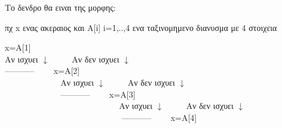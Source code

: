 \documentclass[12pt]{article}
\begin{document}
Το δενδρο θα ειναι της μορφης:$$ $$

πχ x ενας ακεραιος και A[i] i=1,..,4 ενα ταξινομημενο διανυσμα με 4 στοιχεια$$ $$
\begin{center}
x=A[1] $$ $$
Αν ισχυει $\downarrow$ $\qquad$ Αν δεν ισχυει $\downarrow$ $$ $$
-----------$\qquad$ x=A[2]$$ $$
$\qquad$ $\qquad$ $\qquad$Αν ισχυει $\downarrow$ $\qquad$ Αν δεν ισχυει $\downarrow$ $$ $$
$\qquad$ $\qquad$ $\qquad$-----------$\qquad$ x=A[3]$$ $$
$\qquad$ $\qquad$ $\qquad$ $\qquad$ $\qquad$ $\qquad$Αν ισχυει $\downarrow$ $\qquad$ Αν δεν ισχυει $\downarrow$ $$ $$
$\qquad$ $\qquad$ $\qquad$ $\qquad$ $\qquad$ $\qquad$ -----------$\qquad$ x=A[4]$$ $$
\end{center}
\end{document}
